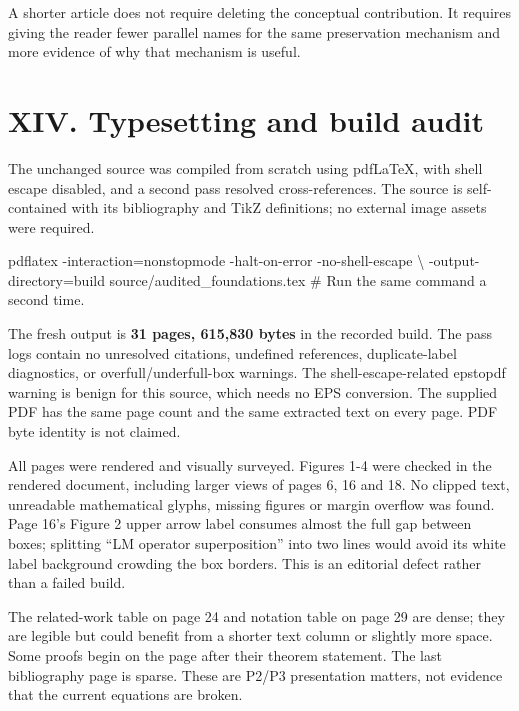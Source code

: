 \documentclass[
  10pt,
]{article}
\newenvironment{Shaded}{}{}
\newcommand{\NormalTok}[1]{#1}
\begin{document}
A shorter article does not require deleting the conceptual contribution.
It requires giving the reader fewer parallel names for the same
preservation mechanism and more evidence of why that mechanism is
useful.

\section{XIV. Typesetting and build
audit}\label{xiv.-typesetting-and-build-audit}

The unchanged source was compiled from scratch using pdfLaTeX, with
shell escape disabled, and a second pass resolved cross-references. The
source is self-contained with its bibliography and TikZ definitions; no
external image assets were required.

\begin{Shaded}
\begin{Highlighting}[]
\NormalTok{pdflatex {-}interaction=nonstopmode {-}halt{-}on{-}error {-}no{-}shell{-}escape \textbackslash{}}
\NormalTok{  {-}output{-}directory=build source/audited\_foundations.tex}
\NormalTok{\# Run the same command a second time.}
\end{Highlighting}
\end{Shaded}

The fresh output is \textbf{31 pages, 615,830 bytes} in the recorded
build. The pass logs contain no unresolved citations, undefined
references, duplicate-label diagnostics, or overfull/underfull-box
warnings. The shell-escape-related epstopdf warning is benign for this
source, which needs no EPS conversion. The supplied PDF has the same
page count and the same extracted text on every page. PDF byte identity
is not claimed.

All pages were rendered and visually surveyed. Figures 1-4 were checked
in the rendered document, including larger views of pages 6, 16 and 18.
No clipped text, unreadable mathematical glyphs, missing figures or
margin overflow was found. Page 16's Figure 2 upper arrow label consumes
almost the full gap between boxes; splitting ``LM operator
superposition'' into two lines would avoid its white label background
crowding the box borders. This is an editorial defect rather than a
failed build.

The related-work table on page 24 and notation table on page 29 are
dense; they are legible but could benefit from a shorter text column or
slightly more space. Some proofs begin on the page after their theorem
statement. The last bibliography page is sparse. These are P2/P3
presentation matters, not evidence that the current equations are
broken.
\end{document}
